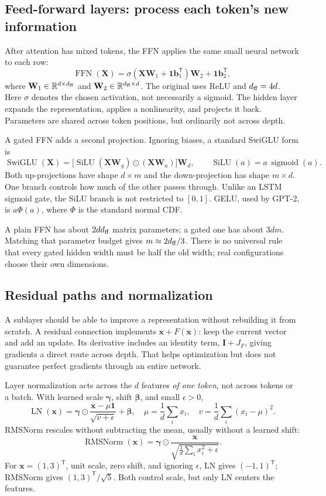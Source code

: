 \documentclass[11pt, oneside]{book}
\newcommand{\R}{\mathbb{R}}
\newcommand{\T}{^{\mathsf{T}}}           %
\let\originalsubsection\subsection
\renewcommand{\subsection}{\Needspace{6\baselineskip}\originalsubsection}
\begin{document}
\subsection*{Feed-forward layers: process each token's new information}
After attention has mixed tokens, the FFN applies the same small neural network to each row:
\[
 \operatorname{FFN}(\mathbf{X})=
 \sigma(\mathbf{X}\mathbf{W}_1+\mathbf{1}\mathbf{b}_1\T)\mathbf{W}_2
 +\mathbf{1}\mathbf{b}_2\T,
\]
where $\mathbf{W}_1\in\R^{d\times d_{\rm ff}}$ and $\mathbf{W}_2\in\R^{d_{\rm ff}\times d}$. The original uses ReLU and $d_{\rm ff}=4d$. Here $\sigma$ denotes the chosen activation, not necessarily a sigmoid. The hidden layer expands the representation, applies a nonlinearity, and projects it back. Parameters are shared across token positions, but ordinarily not across depth.

A gated FFN adds a second projection. Ignoring biases, a standard SwiGLU form is
\[
 \operatorname{SwiGLU}(\mathbf{X})=
 \bigl[\operatorname{SiLU}(\mathbf{X}\mathbf{W}_g)\odot
       (\mathbf{X}\mathbf{W}_u)\bigr]\mathbf{W}_d,
 \qquad \operatorname{SiLU}(a)=a\,\operatorname{sigmoid}(a).
\]
Both up-projections have shape $d\times m$ and the down-projection has shape $m\times d$. One branch controls how much of the other passes through. Unlike an LSTM sigmoid gate, the SiLU branch is not restricted to $[0,1]$. GELU, used by GPT-2, is $a\Phi(a)$, where $\Phi$ is the standard normal CDF.

A plain FFN has about $2dd_{\rm ff}$ matrix parameters; a gated one has about $3dm$. Matching that parameter budget gives $m\approx 2d_{\rm ff}/3$. There is no universal rule that every gated hidden width must be half the old width; real configurations choose their own dimensions.

\subsection*{Residual paths and normalization}
A sublayer should be able to improve a representation without rebuilding it from scratch. A residual connection implements $\mathbf{x}+F(\mathbf{x})$: keep the current vector and add an update. Its derivative includes an identity term, $\mathbf{I}+J_F$, giving gradients a direct route across depth. That helps optimization but does not guarantee perfect gradients through an entire network.

Layer normalization acts across the $d$ features \emph{of one token}, not across tokens or a batch. With learned scale $\boldsymbol{\gamma}$, shift $\boldsymbol{\beta}$, and small $\epsilon>0$,
\[
 \operatorname{LN}(\mathbf{x})=
 \boldsymbol{\gamma}\odot\frac{\mathbf{x}-\mu\mathbf{1}}{\sqrt{v+\epsilon}}+\boldsymbol{\beta},
 \quad \mu=\frac1d\sum_i x_i,\quad v=\frac1d\sum_i(x_i-\mu)^2.
\]
RMSNorm rescales without subtracting the mean, usually without a learned shift:
\[
 \operatorname{RMSNorm}(\mathbf{x})=
 \boldsymbol{\gamma}\odot\frac{\mathbf{x}}{\sqrt{\frac1d\sum_i x_i^2+\epsilon}}.
\]
For $\mathbf{x}=(1,3)\T$, unit scale, zero shift, and ignoring $\epsilon$, LN gives $(-1,1)\T$; RMSNorm gives $(1,3)\T/\sqrt5$. Both control scale, but only LN centers the features.
\end{document}
